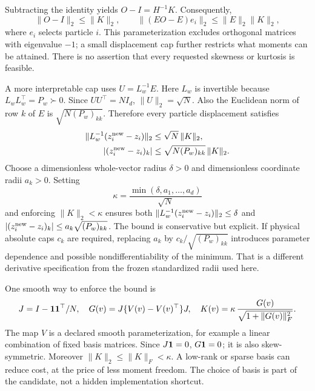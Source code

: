 Subtracting the identity yields \(O-I=H^{-1}K\). Consequently,
\begin{equation}
\label{eq:bf-covariance-proposal-cayley-bound}
 \|O-I\|_2\leq\|K\|_2,\qquad
 \|(EO-E)e_i\|_2\leq\|E\|_2\|K\|_2,
\end{equation}
where \(e_i\) selects particle \(i\).
This parameterization excludes orthogonal matrices with eigenvalue \(-1\);
a small displacement cap further restricts what moments can be attained.
There is no assertion that every requested skewness or kurtosis is feasible.

A more interpretable cap uses \(U=L_w^{-1}E\). Here \(L_w\) is invertible
because \(L_wL_w^\top=P_w\succ0\). Since \(UU^\top=NI_d\),
\(\|U\|_2=\sqrt N\). Also the Euclidean norm of row \(k\) of \(E\) is
\(\sqrt{N(P_w)_{kk}}\). Therefore every particle displacement satisfies
\begin{align}
\label{eq:bf-covariance-proposal-dual-caps}
 \|L_w^{-1}(z_i^{\rm new}-z_i)\|_2
       &\leq\sqrt N\,\|K\|_2,\\
 |(z_i^{\rm new}-z_i)_k|
       &\leq\sqrt{N(P_w)_{kk}}\,\|K\|_2 .
 \nonumber
\end{align}
Choose a dimensionless whole-vector radius \(\delta>0\) and dimensionless
coordinate radii \(a_k>0\). Setting
\begin{equation}
\label{eq:bf-covariance-proposal-kappa}
 \kappa=\frac{\min(\delta,a_1,\ldots,a_d)}{\sqrt N}
\end{equation}
and enforcing \(\|K\|_2<\kappa\) ensures both
\(\|L_w^{-1}(z_i^{\rm new}-z_i)\|_2\leq\delta\) and
\(|(z_i^{\rm new}-z_i)_k|\leq a_k\sqrt{(P_w)_{kk}}\).
The bound is conservative but explicit. If physical absolute caps \(c_k\)
are required, replacing \(a_k\) by \(c_k/\sqrt{(P_w)_{kk}}\) introduces
parameter dependence and possible nondifferentiability of the minimum.
That is a different derivative specification from the frozen standardized
radii used here.

One smooth way to enforce the bound is
\begin{equation}
\label{eq:bf-covariance-proposal-bounded-skew}
 J=I-\mathbf 1\mathbf 1^\top/N,\quad
 G(v)=J\{V(v)-V(v)^\top\}J,\quad
 K(v)=\kappa\,\frac{G(v)}{\sqrt{1+\|G(v)\|_F^2}} .
\end{equation}
The map \(V\) is a declared smooth parameterization, for example a linear
combination of fixed basis matrices. Since \(J\mathbf 1=0\), \(G\mathbf 1=0\);
it is also skew-symmetric. Moreover
\(\|K\|_2\leq\|K\|_F<\kappa\).
A low-rank or sparse basis can reduce cost, at the price of less moment
freedom. The choice of basis is part of the candidate, not a hidden
implementation shortcut.

